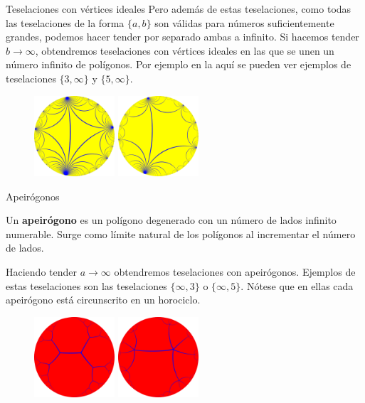 \documentclass[compress]{beamer}
\begin{document}
\begin{frame}{Teselaciones con vértices ideales}
  Pero además de estas teselaciones, como todas las teselaciones de
  la forma $\{a,b\}$ son válidas para números suficientemente grandes,
  podemos hacer tender por separado ambas a infinito. Si hacemos tender
  $b \to \infty$, obtendremos teselaciones con vértices ideales en las
  que se unen un número infinito de polígonos. Por ejemplo en la
  aquí se pueden ver ejemplos de teselaciones $\{3,\infty\}$
  y $\{5,\infty\}$.

  \begin{figure}[ht!]
    \centering
    \includegraphics[width=30mm]{./tiling-3-i.png}
    \quad
    \includegraphics[width=30mm]{./tiling-5-i.png}
  \end{figure}
\end{frame}


\begin{frame}{Apeirógonos}
  \begin{definition}
    Un \textbf{apeirógono} es un polígono degenerado con un número de
    lados infinito numerable. Surge como límite natural de los polígonos
    al incrementar el número de lados.
  \end{definition}

  Haciendo tender $a \to \infty$ obtendremos teselaciones con
  apeirógonos.  Ejemplos de estas teselaciones son las teselaciones
  $\{\infty,3\}$ o $\{\infty,5\}$. Nótese que en ellas cada apeirógono
  está circunscrito en un horociclo.

  \begin{figure}[ht!]
    \centering
    \includegraphics[width=30mm]{./tiling-i-3.png}
    \quad
    \includegraphics[width=30mm]{./tiling-i-5.png}
  \end{figure}
\end{frame}
\end{document}
